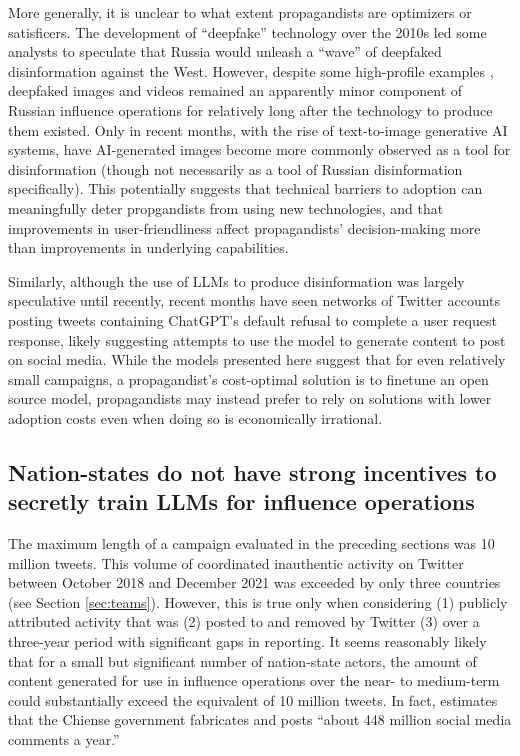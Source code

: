 \documentclass{article}
\begin{document}
More generally, it is unclear to what extent propagandists are optimizers or satisficers. The development of ``deepfake'' technology over the 2010s led some analysts to speculate that Russia would unleash a ``wave'' of deepfaked disinformation against the West. \cite{wave} However, despite some high-profile examples \cite{zelenskyy}, deepfaked images and videos remained an apparently minor component of Russian influence operations for relatively long after the technology to produce them existed. Only in recent months, with the rise of text-to-image generative AI systems, have AI-generated images become more commonly observed as a tool for disinformation (though not necessarily as a tool of Russian disinformation specifically). \cite{trump, putin} This potentially suggests that technical barriers to adoption can meaningfully deter propgandists from using new technologies, and that improvements in user-friendliness affect propagandists' decision-making more than improvements in underlying capabilities. 

Similarly, although the use of LLMs to produce disinformation was largely speculative until recently, recent months have seen networks of Twitter accounts posting tweets containing ChatGPT's default refusal to complete a user request response, likely suggesting attempts to use the model to generate content to post on social media. \cite{conspirator} While the models presented here suggest that for even relatively small campaigns, a propagandist's cost-optimal solution is to finetune an open source model, propagandists may instead prefer to rely on solutions with lower adoption costs even when doing so is economically irrational. 

\subsection{Nation-states do not have strong incentives to secretly train LLMs for influence operations}

The maximum length of a campaign evaluated in the preceding sections was 10 million tweets. This volume of coordinated inauthentic activity on Twitter between October 2018 and December 2021 was exceeded by only three countries (see Section \ref{sec:teams}). However, this is true only when considering (1) publicly attributed activity that was (2) posted to and removed by Twitter (3) over a three-year period with significant gaps in reporting. It seems reasonably likely that for a small but significant number of nation-state actors, the amount of content generated for use in influence operations over the near- to medium-term could substantially exceed the equivalent of 10 million tweets. In fact, \cite{king} estimates that the Chiense government fabricates and posts ``about 448 million social media comments a year.'' 
\end{document}
